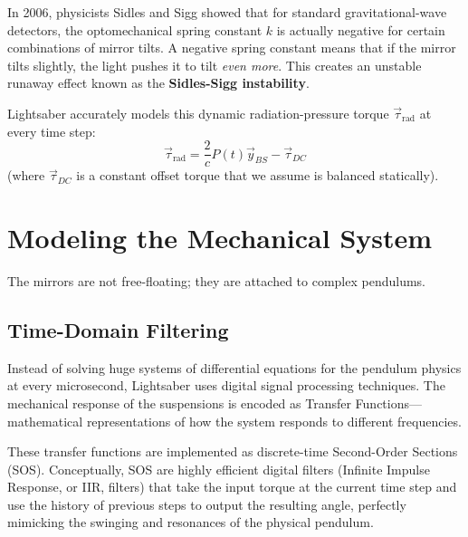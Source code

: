 \documentclass{article}
\begin{document}
In 2006, physicists Sidles and Sigg showed that for standard gravitational-wave detectors, the optomechanical spring constant $k$ is actually negative for certain combinations of mirror tilts. A negative spring constant means that if the mirror tilts slightly, the light pushes it to tilt \textit{even more}. This creates an unstable runaway effect known as the \textbf{Sidles-Sigg instability}.

Lightsaber accurately models this dynamic radiation-pressure torque $\vec{\tau}_{\text{rad}}$ at every time step:
\begin{equation}
    \vec{\tau}_{\text{rad}} = \frac{2}{c} P(t) \vec{y}_{BS} - \vec{\tau}_{DC}
\end{equation}
(where $\vec{\tau}_{DC}$ is a constant offset torque that we assume is balanced statically).

\section{Modeling the Mechanical System}
The mirrors are not free-floating; they are attached to complex pendulums. 

\subsection{Time-Domain Filtering}
Instead of solving huge systems of differential equations for the pendulum physics at every microsecond, Lightsaber uses digital signal processing techniques. The mechanical response of the suspensions is encoded as Transfer Functions---mathematical representations of how the system responds to different frequencies.

These transfer functions are implemented as discrete-time Second-Order Sections (SOS). Conceptually, SOS are highly efficient digital filters (Infinite Impulse Response, or IIR, filters) that take the input torque at the current time step and use the history of previous steps to output the resulting angle, perfectly mimicking the swinging and resonances of the physical pendulum.
\end{document}
